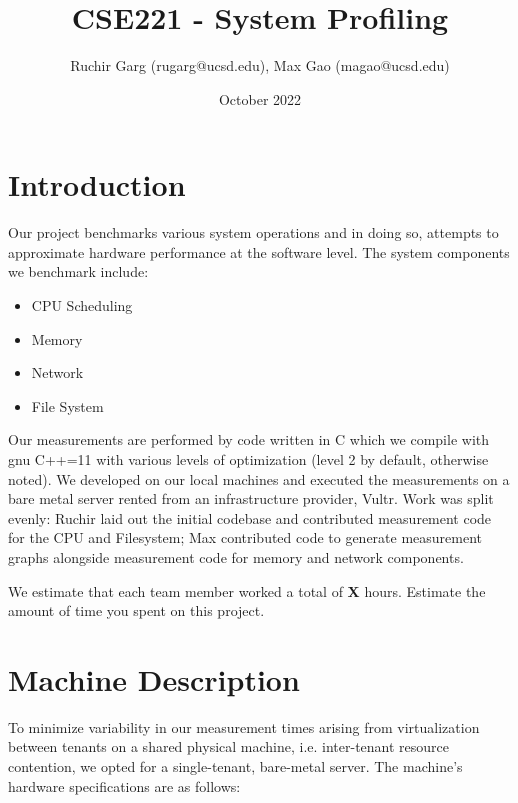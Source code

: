 \documentclass{article}
\title{CSE221 - System Profiling}
\author{Ruchir Garg (rugarg@ucsd.edu), Max Gao (magao@ucsd.edu) }
\date{October 2022}
\begin{document}
\maketitle

\section{Introduction}

Our project benchmarks various system operations and in doing so, attempts to 
approximate hardware performance at the software level. The system components
we benchmark include:
\begin{itemize}
    \item CPU Scheduling
    \item Memory
    \item Network
    \item File System
\end{itemize}

Our measurements are performed by code written in C which we compile with gnu C++=11
with various levels of optimization (level 2 by default, otherwise noted). We developed on
our local machines and executed the measurements on a bare metal server rented from an
infrastructure provider, Vultr. Work was split evenly: Ruchir laid out the initial codebase
and contributed measurement code for the CPU and Filesystem; Max contributed code to generate
measurement graphs alongside measurement code for memory and network components. 

We estimate that each team member worked a total of \textbf{X} hours.
Estimate the amount of time you spent on this project.

\section{Machine Description}
\label{sec:mach}

To minimize variability in our measurement times arising from virtualization between tenants on a 
shared physical machine, i.e. inter-tenant resource contention, we opted for a single-tenant, 
bare-metal server. 
The machine's hardware specifications are as follows:
\end{document}
